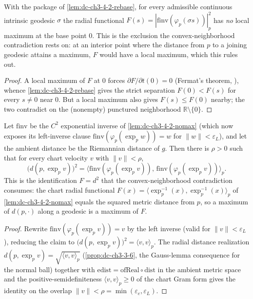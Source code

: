 \begin{lemma}
  \label{lem:dc-ch3-4-2-nomax}
  \leanok
  With the package of \cref{lem:dc-ch3-4-2-rebase}, for every admissible continuous intrinsic
  geodesic $\sigma$ the radial functional $F(s)=|\mathrm{finv}(\varphi_p(\sigma s))|_p^2$ has
  \emph{no} local maximum at the base point $0$. This is the exclusion the
  convex-neighborhood contradiction rests on: at an interior point where the distance from $p$ to
  a joining geodesic attains a maximum, $F$ would have a local maximum, which this rules out.
\end{lemma}
\begin{proof}
  \sketch
  \leanok
  A local maximum of $F$ at $0$ forces $\partial F/\partial t(0)=0$ (Fermat's theorem,
  ), whence \cref{lem:dc-ch3-4-2-rebase} gives the strict
  separation $F(0)<F(s)$ for every $s\neq0$ near $0$. But a local maximum also gives $F(s)\le F(0)$
  nearby; the two contradict on the (nonempty) punctured neighborhood $\mathbb R\setminus\{0\}$.

\end{proof}

\begin{lemma}
  \label{lem:dc-ch3-4-2-bridge}
  \leanok
  Let $\mathrm{finv}$ be the $C^2$ exponential inverse of \cref{lem:dc-ch3-4-2-nomax} (which now
  exposes its left-inverse clause $\mathrm{finv}(\varphi_p(\exp_p w))=w$ for $\|w\|<\varepsilon_L$),
  and let the ambient distance be the Riemannian distance of $g$. Then there is $\rho>0$ such that
  for every chart velocity $v$ with $\|v\|<\rho$,
  $$ \big(d(p,\exp_p v)\big)^2 = \big\langle \mathrm{finv}(\varphi_p(\exp_p v)),\,
     \mathrm{finv}(\varphi_p(\exp_p v))\big\rangle_p . $$
  This is the identification $F=d^2$ that the convex-neighborhood contradiction consumes:
  the chart radial functional $F(x)=\langle\exp_p^{-1}(x),\exp_p^{-1}(x)\rangle_p$ of
  \cref{lem:dc-ch3-4-2-nomax} equals the squared metric distance from $p$, so a maximum of
  $d(p,\cdot)$ along a geodesic is a maximum of $F$.
\end{lemma}
\begin{proof}
  \sketch
  \leanok
  Rewrite $\mathrm{finv}(\varphi_p(\exp_p v))=v$ by the left inverse (valid for $\|v\|<\varepsilon_L$),
  reducing the claim to $\big(d(p,\exp_p v)\big)^2=\langle v,v\rangle_p$. The radial distance
  realization $d(p,\exp_p v)=\sqrt{\langle v,v\rangle_p}$ (\cref{prop:dc-ch3-3-6}, the Gauss-lemma
  consequence for the normal ball) together with $\mathrm{edist}=\mathrm{ofReal}\circ\mathrm{dist}$ in
  the ambient metric space and the positive-semidefiniteness $\langle v,v\rangle_p\ge0$ of the chart
  Gram form gives the identity on the overlap $\|v\|<\rho=\min(\varepsilon_e,\varepsilon_L)$.
\end{proof}


